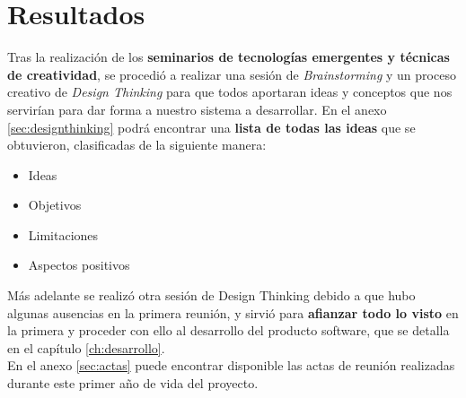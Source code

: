 \section{Resultados}
Tras la realización de los \textbf{seminarios de tecnologías emergentes y técnicas de creatividad}, se procedió a realizar una sesión de \textit{Brainstorming} y un proceso creativo de \textit{Design Thinking} para que todos aportaran ideas y conceptos que nos servirían para dar forma a nuestro sistema a desarrollar. En el anexo \ref{sec:designthinking} podrá encontrar una \textbf{lista de todas las ideas} que se obtuvieron, clasificadas de la siguiente manera:

\begin{itemize}
    \item Ideas
    \item Objetivos
    \item Limitaciones
    \item Aspectos positivos
\end{itemize}

Más adelante se realizó otra sesión de Design Thinking debido a que hubo algunas ausencias en la primera reunión, y sirvió para \textbf{afianzar todo lo visto} en la primera y proceder con ello al desarrollo del producto software, que se detalla en el capítulo \ref{ch:desarrollo}.\\

En el anexo \ref{sec:actas} puede encontrar disponible las actas de reunión realizadas durante este primer año de vida del proyecto.
